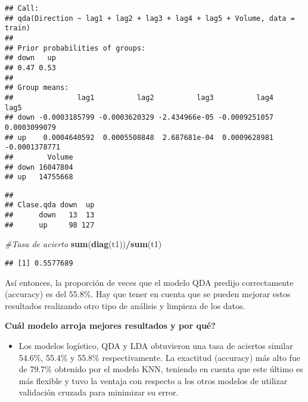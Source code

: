 \documentclass[
]{article}
\newenvironment{Shaded}{\begin{snugshade}}{\end{snugshade}}
\newcommand{\CommentTok}[1]{\textcolor[rgb]{0.56,0.35,0.01}{\textit{#1}}}
\newcommand{\KeywordTok}[1]{\textcolor[rgb]{0.13,0.29,0.53}{\textbf{#1}}}
\newcommand{\NormalTok}[1]{#1}
\newcommand{\OperatorTok}[1]{\textcolor[rgb]{0.81,0.36,0.00}{\textbf{#1}}}
\providecommand{\tightlist}{%
  \setlength{\itemsep}{0pt}\setlength{\parskip}{0pt}}
\begin{document}
\begin{verbatim}
## Call:
## qda(Direction ~ lag1 + lag2 + lag3 + lag4 + lag5 + Volume, data = train)
## 
## Prior probabilities of groups:
## down   up 
## 0.47 0.53 
## 
## Group means:
##               lag1          lag2          lag3          lag4          lag5
## down -0.0003185799 -0.0003620329 -2.434966e-05 -0.0009251057  0.0003099079
## up    0.0004640592  0.0005508848  2.687681e-04  0.0009628981 -0.0001378771
##        Volume
## down 16047804
## up   14755668
\end{verbatim}

\begin{Shaded}
\end{Shaded}

\begin{verbatim}
##          
## Clase.qda down  up
##      down   13  13
##      up     98 127
\end{verbatim}

\begin{Shaded}
\begin{Highlighting}[]
\CommentTok{#Tasa de acierto}
\KeywordTok{sum}\NormalTok{(}\KeywordTok{diag}\NormalTok{(t1))}\OperatorTok{/}\KeywordTok{sum}\NormalTok{(t1) }
\end{Highlighting}
\end{Shaded}

\begin{verbatim}
## [1] 0.5577689
\end{verbatim}

Así entonces, la proporción de veces que el modelo QDA predijo
correctamente (accuracy) es del 55.8\%. Hay que tener en cuenta que se
pueden mejorar estos resultados realizando otro tipo de análisis y
limpieza de los datos.

\textbf{Cuál modelo arroja mejores resultados y por qué?}

\begin{itemize}
\tightlist
\item
  Los modelos logístico, QDA y LDA obtuvieron una tasa de aciertos
  similar 54.6\%, 55.4\% y 55.8\% respectivamente. La exactitud
  (accuracy) más alto fue de 79.7\% obtenido por el modelo KNN, teniendo
  en cuenta que este último es más flexible y tuvo la ventaja con
  respecto a los otros modelos de utilizar validación cruzada para
  minimizar su error.
\end{itemize}
\end{document}
